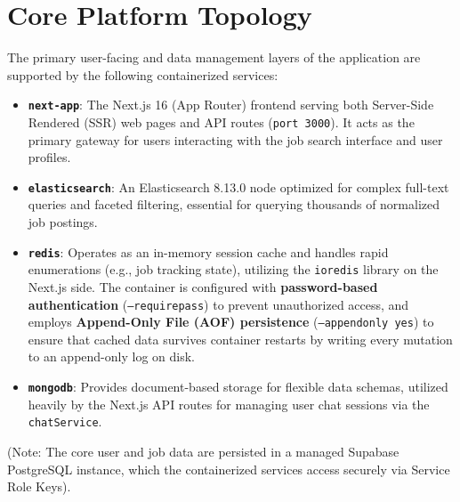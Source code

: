 \section{Core Platform Topology}
The primary user-facing and data management layers of the application are supported by the following containerized services:
\begin{itemize}
\item \textbf{\texttt{next-app}}: The Next.js 16 (App Router) frontend serving both Server-Side Rendered (SSR) web pages and API routes (\texttt{port 3000}). It acts as the primary gateway for users interacting with the job search interface and user profiles.
\item \textbf{\texttt{elasticsearch}}: An Elasticsearch 8.13.0 node optimized for complex full-text queries and faceted filtering, essential for querying thousands of normalized job postings.
\item \textbf{\texttt{redis}}: Operates as an in-memory session cache and handles rapid enumerations (e.g., job tracking state), utilizing the \texttt{ioredis} library on the Next.js side. The container is configured with \textbf{password-based authentication} (\texttt{--requirepass}) to prevent unauthorized access, and employs \textbf{Append-Only File (AOF) persistence} (\texttt{--appendonly yes}) to ensure that cached data survives container restarts by writing every mutation to an append-only log on disk.
\item \textbf{\texttt{mongodb}}: Provides document-based storage for flexible data schemas, utilized heavily by the Next.js API routes for managing user chat sessions via the \texttt{chatService}.
\end{itemize}

(Note: The core user and job data are persisted in a managed Supabase PostgreSQL instance, which the containerized services access securely via Service Role Keys).


